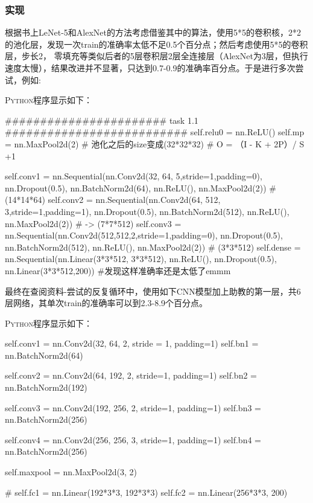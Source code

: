 \documentclass[a4paper,AutoFakeBold,AutoFakeSlant]{ctexart}
\begin{document}
\subsubsection{实现}
根据书上LeNet-5和AlexNet的方法考虑借鉴其中的算法，使用5*5的卷积核，2*2的池化层，发现一次train的准确率太低不足0.5个百分点；然后考虑使用5*5的卷积层，步长2，
零填充等类似后者的5层卷积层2层全连接层（AlexNet为3层，但执行速度太慢），结果改进并不显著，只达到0.7-0.9的准确率百分点。于是进行多次尝试，例如:

\textsc{Python}程序显示如下：
\begin{python}
  ####################### task 1.1 ##########################
  self.relu0 = nn.ReLU()
  self.mp = nn.MaxPool2d(2) # 池化之后的size变成(32*32*32)
    # O = （I - K + 2P）/ S +1

  self.conv1 = nn.Sequential(nn.Conv2d(32, 64, 5,stride=1,padding=0),
                              nn.Dropout(0.5),
                              nn.BatchNorm2d(64),                         
                              nn.ReLU(),
                              nn.MaxPool2d(2)) # \rightarrow (14*14*64)
  self.conv2 = nn.Sequential(nn.Conv2d(64, 512, 3,stride=1,padding=1), 
                              nn.Dropout(0.5),
                              nn.BatchNorm2d(512),
                              nn.ReLU(),
                              nn.MaxPool2d(2)) #  -> (7*7*512)
  self.conv3 = nn.Sequential(nn.Conv2d(512,512,2,stride=1,padding=0), 
                              nn.Dropout(0.5), 
                              nn.BatchNorm2d(512),
                              nn.ReLU(),
                              nn.MaxPool2d(2)) #  (3*3*512)
  self.dense = nn.Sequential(nn.Linear(3*3*512, 3*3*512),
                              nn.ReLU(),
                              nn.Dropout(0.5),
                              nn.Linear(3*3*512,200))  
#发现这样准确率还是太低了emmm
\end{python}
最终在查阅资料-尝试的反复循环中，使用如下CNN模型加上助教的第一层，共6层网络，其单次train的准确率可以到2.3-8.9个百分点。

\textsc{Python}程序显示如下：
\begin{python}
  self.conv1 = nn.Conv2d(32, 64, 2, stride = 1, padding=1)
  self.bn1 = nn.BatchNorm2d(64)

  self.conv2 = nn.Conv2d(64, 192, 2, stride=1, padding=1)
  self.bn2 = nn.BatchNorm2d(192)

  self.conv3 = nn.Conv2d(192, 256, 2, stride=1, padding=1)
  self.bn3 = nn.BatchNorm2d(256)
  
  self.conv4 = nn.Conv2d(256, 256, 3, stride=1, padding=1)
  self.bn4 = nn.BatchNorm2d(256)

  self.maxpool = nn.MaxPool2d(3, 2)

  # self.fc1 = nn.Linear(192*3*3, 192*3*3)
  self.fc2 = nn.Linear(256*3*3, 200)
\end{python}
\end{document}
